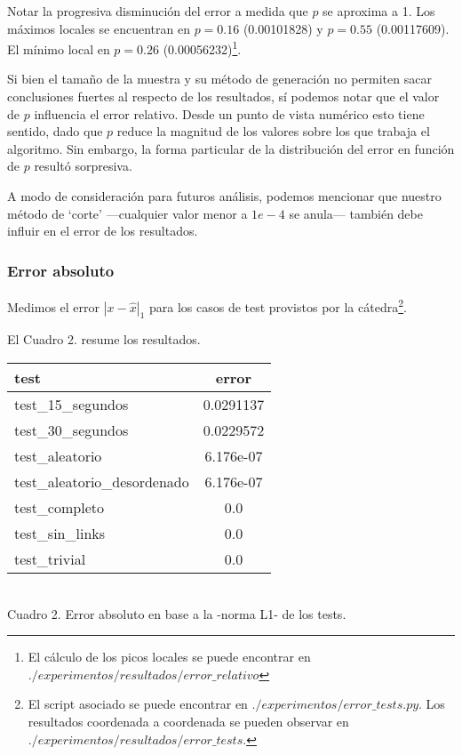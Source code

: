 Notar la progresiva disminución del error a medida que $p$ se aproxima a 1. Los máximos locales se encuentran en $p = 0.16$ (0.00101828)  y $p = 0.55$ (0.00117609). El mínimo local en $p = 0.26$ (0.00056232)\footnote{El cálculo de los picos locales se puede encontrar en $./experimentos/resultados/error\_relativo$}. 

\vspace{1em}
Si bien el tamaño de la muestra y su método de generación no permiten sacar conclusiones fuertes al respecto de los resultados, sí podemos notar que el valor de $p$ influencia el error relativo. Desde un punto de vista numérico esto tiene sentido, dado que $p$ reduce la  magnitud de los valores sobre los que trabaja el algoritmo. Sin embargo, la forma particular de la distribución del error en función de $p$ resultó sorpresiva. 

\vspace{1em}
A modo de consideración para futuros análisis, podemos mencionar que nuestro método de `corte' ---cualquier valor menor a $1e-4$ se anula--- también debe influir en el error de los resultados. 


\newpage
\subsubsection{Error absoluto} Medimos el error $|x - \hat{x}|_1$ para los casos de test provistos por la cátedra\footnote{El script asociado se puede encontrar en $./experimentos/error\_tests.py$. Los resultados coordenada a coordenada se pueden observar en $./experimentos/resultados/error\_tests$.}. 
\vspace{1em}

\noindent El Cuadro 2. resume los resultados.
\vspace{1.5em}

\begin{center}
    \begin{tabular}{ |l|c| } 
    \hline
    test                         & error        \\
    \hline
    test\_15\_segundos           & 0.0291137    \\
    test\_30\_segundos           & 0.0229572    \\
    test\_aleatorio              & 6.176e-07    \\
    test\_aleatorio\_desordenado & 6.176e-07    \\
    test\_completo               & 0.0          \\
    test\_sin\_links             & 0.0          \\
    test\_trivial                & 0.0          \\
    \hline
    \end{tabular} \\
    \bigskip
    Cuadro 2. Error absoluto en base a la -norma L1- de los tests. 
\end{center}
\vspace{1em}

